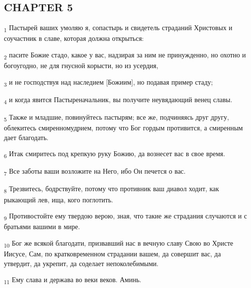\subsection{CHAPTER 5}
\begin{tcolorbox}
\textsubscript{1} Пастырей ваших умоляю я, сопастырь и свидетель страданий Христовых и соучастник в славе, которая должна открыться:
\end{tcolorbox}
\begin{tcolorbox}
\textsubscript{2} пасите Божие стадо, какое у вас, надзирая за ним не принужденно, но охотно и богоугодно, не для гнусной корысти, но из усердия,
\end{tcolorbox}
\begin{tcolorbox}
\textsubscript{3} и не господствуя над наследием [Божиим], но подавая пример стаду;
\end{tcolorbox}
\begin{tcolorbox}
\textsubscript{4} и когда явится Пастыреначальник, вы получите неувядающий венец славы.
\end{tcolorbox}
\begin{tcolorbox}
\textsubscript{5} Также и младшие, повинуйтесь пастырям; все же, подчиняясь друг другу, облекитесь смиренномудрием, потому что Бог гордым противится, а смиренным дает благодать.
\end{tcolorbox}
\begin{tcolorbox}
\textsubscript{6} Итак смиритесь под крепкую руку Божию, да вознесет вас в свое время.
\end{tcolorbox}
\begin{tcolorbox}
\textsubscript{7} Все заботы ваши возложите на Него, ибо Он печется о вас.
\end{tcolorbox}
\begin{tcolorbox}
\textsubscript{8} Трезвитесь, бодрствуйте, потому что противник ваш диавол ходит, как рыкающий лев, ища, кого поглотить.
\end{tcolorbox}
\begin{tcolorbox}
\textsubscript{9} Противостойте ему твердою верою, зная, что такие же страдания случаются и с братьями вашими в мире.
\end{tcolorbox}
\begin{tcolorbox}
\textsubscript{10} Бог же всякой благодати, призвавший нас в вечную славу Свою во Христе Иисусе, Сам, по кратковременном страдании вашем, да совершит вас, да утвердит, да укрепит, да соделает непоколебимыми.
\end{tcolorbox}
\begin{tcolorbox}
\textsubscript{11} Ему слава и держава во веки веков. Аминь.
\end{tcolorbox}
